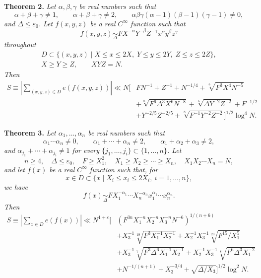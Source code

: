 \documentclass[10pt]{article}
\begin{document}
\medskip
\noindent\textbf{Theorem 2.}
\textit{Let $\alpha,\beta,\gamma$ be real numbers such that
\[
  \alpha+\beta+\gamma\ne1,\qquad
  \alpha+\beta+\gamma\ne2,\qquad
  \alpha\beta\gamma(\alpha-1)(\beta-1)(\gamma-1)\ne0,
\]
and $\Delta\leqslant\varepsilon_0$. Let $f(x,y,z)$ be a real $C^\infty$ function such that
\[
  f(x,y,z)\underset{\Delta}{\sim}
  FX^{-\alpha}Y^{-\beta}Z^{-\gamma}x^\alpha y^\beta z^\gamma
\]
throughout
\[
\begin{gathered}
  D\subset\{(x,y,z)\mid X\leqslant x\leqslant2X,\;Y\leqslant y\leqslant2Y,\;Z\leqslant z\leqslant2Z\},\\
  X\geqslant Y\geqslant Z,\qquad XYZ=N.
\end{gathered}
\]
Then
\[
\begin{aligned}
S\equiv\left|\sum_{(x,y,z)\in D}e(f(x,y,z))\right|
\ll N\Big[&FN^{-1}+Z^{-1}+N^{-1/4}+\sqrt[5]{F^3X^4N^{-5}}\\
&+\sqrt[8]{F^6\Delta^3X^6N^{-8}}+\sqrt[6]{\Delta Y^{-2}Z^{-2}}+F^{-1/2}\\
&+Y^{-2/5}Z^{-2/5}+\sqrt[8]{F^{-1}Y^{-2}Z^{-2}}\Big]^{1/2}\log^4N.
\end{aligned}
\]}

\medskip
\noindent\textbf{Theorem 3.}
\textit{Let $\alpha_1,\ldots,\alpha_n$ be real numbers such that
\[
  \alpha_1\cdots\alpha_n\ne0,\qquad
  \alpha_1+\cdots+\alpha_n\ne2,\qquad
  \alpha_1+\alpha_2+\alpha_3\ne2,
\]
and $\alpha_{j_1}+\cdots+\alpha_{j_i}\ne1$ for every $\{j_1,\ldots,j_i\}\subset\{1,\ldots,n\}$. Let
\[
  n\geqslant4,\quad \Delta\leqslant\varepsilon_0,\quad F\geqslant X_1^2,
  \quad X_1\geqslant X_2\geqslant\cdots\geqslant X_n,
  \quad X_1X_2\cdots X_n=N,
\]
and let $f(x)$ be a real $C^\infty$ function such that, for
\[
  x\in D\subset\{x\mid X_i\leqslant x_i\leqslant2X_i,\ i=1,\ldots,n\},
\]
we have
\[
  f(x)\underset{\Delta}{\sim}
  FX_1^{-\alpha_1}\cdots X_n^{-\alpha_n}x_1^{\alpha_1}\cdots x_n^{\alpha_n}.
\]
Then
\[
\begin{aligned}
S\equiv\left|\sum_{x\in D}e(f(x))\right|
\ll N^{1+\varepsilon}\Big[&
  \left(F^{3n}X_1^{-n}X_2^{-n}X_3^{-n}N^{-6}\right)^{1/(n+6)}\\
&+X_3^{-1}\sqrt[19]{F^3X_1^{-1}X_2^{-1}}
 +X_2^{-1}X_3^{-1}\sqrt[23]{F^{15}/X_1^5}\\
&+X_3^{-1}\sqrt[7]{F^3\Delta^6X_1^{-1}X_2^{-1}}
 +X_2^{-1}X_3^{-1}\sqrt[8]{F^6\Delta^3X_1^{-2}}\\
&+N^{-1/(n+1)}+X_3^{-3/4}+\sqrt{\Delta/X_3}\Big]^{1/2}\log^2N.
\end{aligned}
\]}
\end{document}
